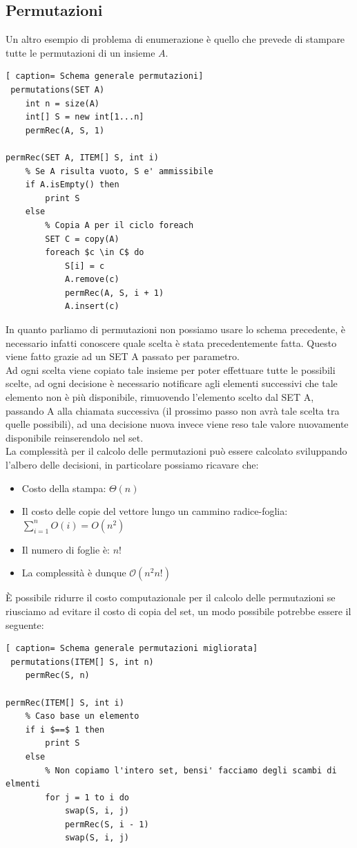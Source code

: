 \documentclass[../cheatSheetAlgoritmi.tex]{subfiles}
\begin{document}
\subsection{Permutazioni}
Un altro esempio di problema di enumerazione è quello che prevede di stampare tutte le permutazioni di un insieme $A$.
 \begin{lstlisting}[ caption= Schema generale permutazioni]
 permutations(SET A)
	int n = size(A)
	int[] S = new int[1...n]
	permRec(A, S, 1)

permRec(SET A, ITEM[] S, int i)
	% Se A risulta vuoto, S e' ammissibile
	if A.isEmpty() then
		print S
	else
		% Copia A per il ciclo foreach
		SET C = copy(A)
		foreach $c \in C$ do
			S[i] = c
			A.remove(c)
			permRec(A, S, i + 1)
			A.insert(c)
\end{lstlisting}
In quanto parliamo di permutazioni non possiamo usare lo schema precedente, è necessario infatti conoscere quale scelta è stata precedentemente fatta. Questo viene fatto grazie ad un SET A passato per parametro. \\
Ad ogni scelta viene copiato tale insieme per poter effettuare tutte le possibili scelte, ad ogni decisione è necessario notificare agli elementi successivi che tale elemento non è più disponibile, rimuovendo l'elemento scelto dal SET A, passando A alla chiamata successiva (il prossimo passo non avrà tale scelta tra quelle possibili), ad una decisione nuova invece viene reso tale valore nuovamente disponibile reinserendolo nel set. \\
La complessità per il calcolo delle permutazioni può essere calcolato sviluppando l'albero delle decisioni, in particolare possiamo ricavare che:
\begin{itemize}
	\item Costo della stampa: $\Theta(n)$
	\item Il costo delle copie del vettore lungo un cammino radice-foglia:
	$\sum_{i = 1}^{n} O(i) = O(n^2)$
	\item Il numero di foglie è: $n!$
	\item La complessità è dunque $\mathcal{O}(n^2n!)$
\end{itemize}
È possibile ridurre il costo computazionale per il calcolo delle permutazioni se riusciamo ad evitare il costo di copia del set, un modo possibile potrebbe essere il seguente:
 \begin{lstlisting}[ caption= Schema generale permutazioni migliorata]
 permutations(ITEM[] S, int n)
	permRec(S, n)

permRec(ITEM[] S, int i)
	% Caso base un elemento
	if i $==$ 1 then
		print S
	else
		% Non copiamo l'intero set, bensi' facciamo degli scambi di elmenti
		for j = 1 to i do
			swap(S, i, j)
			permRec(S, i - 1)
			swap(S, i, j)
\end{lstlisting}
\end{document}
